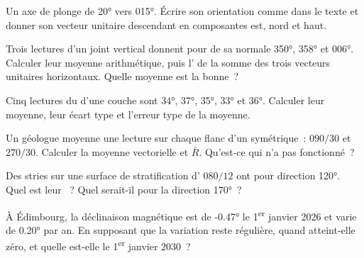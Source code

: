 \begin{exercise}[$\star$]\label{exo:b1:field-lab-methods-1:3}
Un axe de  plonge de \ang{20} vers \ang{015}. Écrire son orientation comme
dans le texte et donner son vecteur unitaire descendant en composantes est, nord
et haut.
\end{exercise}

\begin{exercise}[$\star$]\label{exo:b1:field-lab-methods-1:4}
Trois lectures d'un joint vertical donnent pour  de sa normale \ang{350},
\ang{358} et \ang{006}. Calculer leur moyenne arithmétique, puis l' de la
somme des trois vecteurs unitaires horizontaux. Quelle moyenne est la bonne~?
\end{exercise}

\begin{exercise}[$\star\star$]\label{exo:b1:field-lab-methods-1:5}
Cinq lectures du  d'une couche sont \ang{34}, \ang{37}, \ang{35},
\ang{33} et \ang{36}. Calculer leur moyenne, leur écart type et l'erreur type de
la moyenne.
\end{exercise}

\begin{exercise}[$\star\star$]\label{exo:b1:field-lab-methods-1:6}
Un géologue moyenne une lecture sur chaque flanc d'un  symétrique~: $090/30$
et $270/30$. Calculer la moyenne vectorielle et $\bar R$. Qu'est-ce qui n'a pas
fonctionné~?
\end{exercise}

\begin{exercise}[$\star\star$]\label{exo:b1:field-lab-methods-1:7}
Des stries sur une surface de stratification d' $080/12$ ont pour
direction \ang{120}. Quel est leur ~? Quel serait-il pour la direction
\ang{170}~?
\end{exercise}

\begin{exercise}[$\star\star$]\label{exo:b1:field-lab-methods-1:8}
À Édimbourg, la déclinaison magnétique est de \ang{-0.47} le
1\textsuperscript{er} janvier 2026 et varie de \ang{+0.20} par an. En supposant
que la variation reste régulière, quand atteint-elle zéro, et quelle est-elle le
1\textsuperscript{er} janvier 2030~?
\end{exercise}

